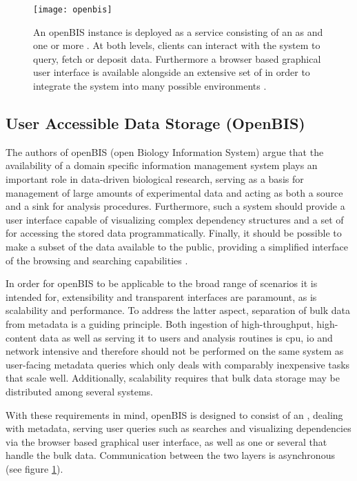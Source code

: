 \begin{figure}
  \centering
  \texttt{[image: openbis]}
  \caption[Overview of the openBIS architecture and a more in-depth look at the data storage implementation.]{An openBIS instance is deployed as a service consisting of an \acrfull{as} and one or more . At both levels, clients can interact with the system to query, fetch or deposit data. Furthermore a browser based graphical user interface is available alongside an extensive set of  in order to integrate the system into many possible environments \citep{Bauch2011}.}
  \label{fig:openbis}
\end{figure}

\subsection{User Accessible Data Storage (OpenBIS)}
The authors of openBIS (open Biology Information System) argue that the availability of a domain specific information management system plays an important role in data-driven biological research, serving as a basis for management of large amounts of experimental data and acting as both a source and a sink for analysis procedures. Furthermore, such a system should provide a user interface capable of visualizing complex dependency structures and a set of  for accessing the stored data programmatically. Finally, it should be possible to make a subset of the data available to the public, providing a simplified interface of the browsing and searching capabilities \citep{Bauch2011}.

In order for openBIS to be applicable to the broad range of scenarios it is intended for, extensibility and transparent interfaces are paramount, as is scalability and performance. To address the latter aspect, separation of bulk data from metadata is a guiding principle. Both ingestion of high-throughput, high-content data as well as serving it to users and analysis routines is \acrshort{cpu}, \acrshort{io} and network intensive and therefore should not be performed on the same system as user-facing metadata queries which only deals with comparably inexpensive tasks that scale well. Additionally, scalability requires that bulk data storage may be distributed among several systems.

With these requirements in mind, openBIS is designed to consist of an , dealing with metadata, serving user queries such as searches and visualizing dependencies via the browser based graphical user interface, as well as one or several  that handle the bulk data. Communication between the two layers is asynchronous (see figure \ref{fig:openbis}).

